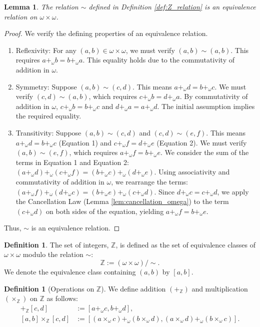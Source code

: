 \documentclass[11pt, a4paper]{article}
\theoremstyle{plain}
\newtheorem{lemma}[theorem]{Lemma}
\theoremstyle{definition}
\newtheorem{definition}[theorem]{Definition}
\numberwithin{equation}{section}
\newcommand{\Z}{\mathbb{Z}}
\begin{document}
\begin{lemma}\label{lem:Z_equivalence_relation}
The relation $\sim$ defined in Definition \ref{def:Z_relation} is an equivalence relation on $\omega \times \omega$.
\end{lemma}
\begin{proof}
We verify the defining properties of an equivalence relation.
\begin{enumerate}
    \item Reflexivity: For any $(a, b) \in \omega \times \omega$, we must verify $(a, b) \sim (a, b)$. This requires $a+_\omega b = b+_\omega a$. This equality holds due to the commutativity of addition in $\omega$.
    \item Symmetry: Suppose $(a, b) \sim (c, d)$. This means $a+_\omega d = b+_\omega c$. We must verify $(c, d) \sim (a, b)$, which requires $c+_\omega b = d+_\omega a$. By commutativity of addition in $\omega$, $c+_\omega b=b+_\omega c$ and $d+_\omega a=a+_\omega d$. The initial assumption implies the required equality.
    \item Transitivity: Suppose $(a, b) \sim (c, d)$ and $(c, d) \sim (e, f)$. This means $a+_\omega d = b+_\omega c$ (Equation 1) and $c+_\omega f = d+_\omega e$ (Equation 2). We must verify $(a, b) \sim (e, f)$, which requires $a+_\omega f = b+_\omega e$.
    We consider the sum of the terms in Equation 1 and Equation 2:
    $(a+_\omega d) +_\omega (c+_\omega f) = (b+_\omega c) +_\omega (d+_\omega e)$.
    Using associativity and commutativity of addition in $\omega$, we rearrange the terms:
    $(a+_\omega f) +_\omega (d+_\omega c) = (b+_\omega e) +_\omega (c+_\omega d)$.
    Since $d+_\omega c = c+_\omega d$, we apply the Cancellation Law (Lemma \ref{lem:cancellation_omega}) to the term $(c+_\omega d)$ on both sides of the equation, yielding $a+_\omega f = b+_\omega e$.
\end{enumerate}
Thus, $\sim$ is an equivalence relation.
\end{proof}

\begin{definition}
The set of integers, $\Z$, is defined as the set of equivalence classes of $\omega \times \omega$ modulo the relation $\sim$:
\begin{equation}
    \Z := (\omega \times \omega) / \sim.
\end{equation}
We denote the equivalence class containing $(a, b)$ by $[a, b]$.
\end{definition}

\begin{definition}[Operations on $\Z$]\label{def:operations_Z}
We define addition $(+_{\Z})$ and multiplication $(\times_{\Z})$ on $\Z$ as follows:
\begin{align}
    [a, b] +_{\Z} [c, d] &:= [a+_\omega c, b+_\omega d], \label{eq:Z_add} \\
    [a, b] \times_{\Z} [c, d] &:= [(a\times_\omega c)+_\omega(b\times_\omega d), (a\times_\omega d)+_\omega(b\times_\omega c)]. \label{eq:Z_mult}
\end{align}
\end{definition}
\end{document}
